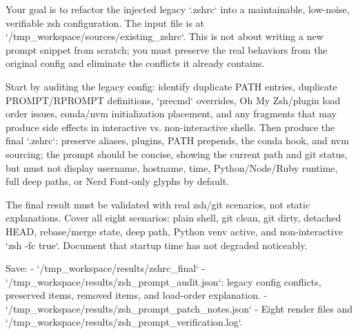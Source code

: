 \begin{clawcode}[title={\texttt{task\_01\_zshrc\_prompt\_refactor}}]
Your goal is to refactor the injected legacy `.zshrc` into a
maintainable, low-noise, verifiable zsh configuration. The input file
is at `/tmp_workspace/sources/existing_zshrc`. This is not about
writing a new prompt snippet from scratch; you must preserve the real
behaviors from the original config and eliminate the conflicts it
already contains.

Start by auditing the legacy config: identify duplicate PATH entries,
duplicate PROMPT/RPROMPT definitions, `precmd` overrides, Oh My
Zsh/plugin load order issues, conda/nvm initialization placement, and
any fragments that may produce side effects in interactive vs.
non-interactive shells. Then produce the final `.zshrc`: preserve
aliases, plugins, PATH prepends, the conda hook, and nvm sourcing;
the prompt should be concise, showing the current path and git
status, but must not display username, hostname, time,
Python/Node/Ruby runtime, full deep paths, or Nerd Font-only glyphs
by default.

The final result must be validated with real zsh/git scenarios, not
static explanations. Cover all eight scenarios: plain shell, git
clean, git dirty, detached HEAD, rebase/merge state, deep path,
Python venv active, and non-interactive `zsh -fc true`. Document
that startup time has not degraded noticeably.

Save:
- `/tmp_workspace/results/zshrc_final`
- `/tmp_workspace/results/zsh_prompt_audit.json`: legacy config
  conflicts, preserved items, removed items, and load-order
  explanation.
- `/tmp_workspace/results/zsh_prompt_patch_notes.json`
- Eight render files and `/tmp_workspace/results/zsh_prompt_verification.log`.
\end{clawcode}


